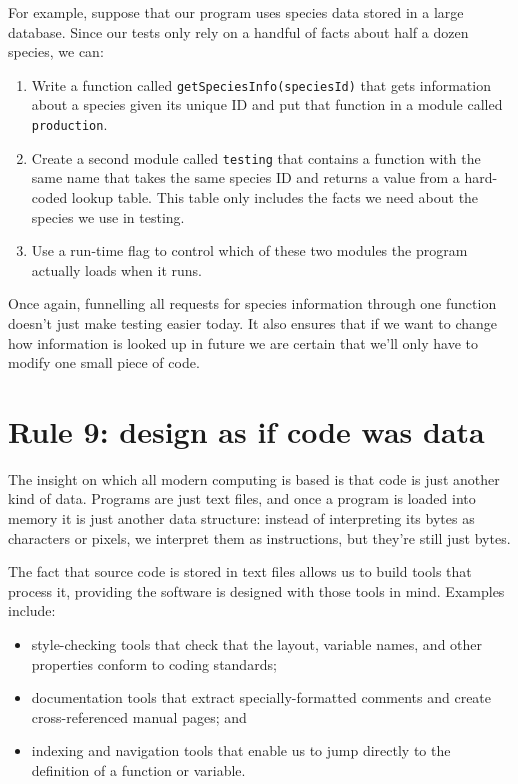 \documentclass[10pt,letterpaper]{article}
\begin{document}
For example,
suppose that our program uses species data stored in a large database.
Since our tests only rely on a handful of facts about half a dozen species,
we can:

\begin{enumerate}
\item
  Write a function called \texttt{getSpeciesInfo(speciesId)}
  that gets information about a species given its unique ID
  and put that function in a module called \texttt{production}.
\item
  Create a second module called \texttt{testing}
  that contains a function with the same name
  that takes the same species ID
  and returns a value from a hard-coded lookup table.
  This table only includes the facts we need about the species we use in testing.
\item
  Use a run-time flag to control which of these two modules the program actually loads
  when it runs.
\end{enumerate}

Once again,
funnelling all requests for species information through one function
doesn't just make testing easier today.
It also ensures that if we want to change how information is looked up in future
we are certain that we'll only have to modify one small piece of code.

\section*{Rule 9: design as if code was data}

The insight on which all modern computing is based is that
code is just another kind of data.
Programs are just text files,
and once a program is loaded into memory it is just another data structure:
instead of interpreting its bytes as characters or pixels,
we interpret them as instructions,
but they're still just bytes.

The fact that source code is stored in text files
allows us to build tools that process it,
providing the software is designed with those tools in mind.
Examples include:

\begin{itemize}
\item
  style-checking tools that check that the layout, variable names, and other properties
  conform to coding standards;
\item
  documentation tools that extract specially-formatted comments
  and create cross-referenced manual pages; and
\item
  indexing and navigation tools that enable us to jump directly to
  the definition of a function or variable.
\end{itemize}
\end{document}
